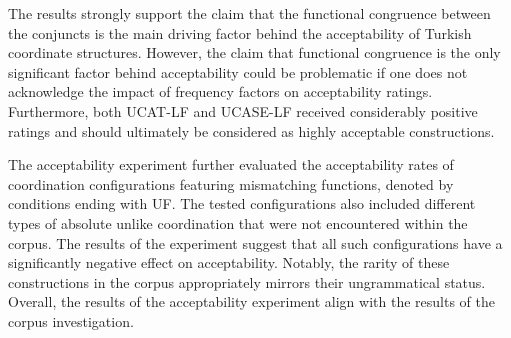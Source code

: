 The results strongly support the claim that the functional congruence between the conjuncts is the main driving factor behind the acceptability of Turkish coordinate structures. However, the claim that functional congruence is the only significant factor behind acceptability could be problematic if one does not acknowledge the impact of frequency factors on acceptability ratings. Furthermore, both UCAT-LF and UCASE-LF received considerably positive ratings and should ultimately be considered as highly acceptable constructions.

The acceptability experiment further evaluated the acceptability rates of coordination configurations featuring mismatching functions, denoted by conditions ending with UF. The tested configurations also included different types of absolute unlike coordination that were not encountered within the corpus. The results of the experiment suggest that all such configurations have a significantly negative effect on acceptability. Notably, the rarity of these constructions in the corpus appropriately mirrors their ungrammatical status. Overall, the results of the acceptability experiment align with the results of the corpus investigation.
